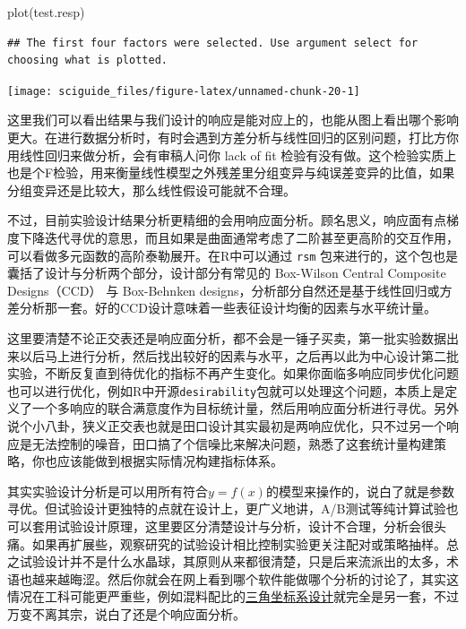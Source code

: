 \documentclass[]{tufte-book}
\newenvironment{Shaded}{}{}
\newcommand{\FunctionTok}[1]{\textcolor[rgb]{0.02,0.16,0.49}{#1}}
\newcommand{\NormalTok}[1]{#1}
\begin{document}
\begin{Shaded}
\begin{Highlighting}[]
\FunctionTok{plot}\NormalTok{(test.resp)}
\end{Highlighting}
\end{Shaded}

\begin{verbatim}
## The first four factors were selected. Use argument select for choosing what is plotted.
\end{verbatim}

\texttt{[image: sciguide\_files/figure-latex/unnamed-chunk-20-1]}

这里我们可以看出结果与我们设计的响应是能对应上的，也能从图上看出哪个影响更大。在进行数据分析时，有时会遇到方差分析与线性回归的区别问题，打比方你用线性回归来做分析，会有审稿人问你 lack of fit 检验有没有做。这个检验实质上也是个F检验，用来衡量线性模型之外残差里分组变异与纯误差变异的比值，如果分组变异还是比较大，那么线性假设可能就不合理。

不过，目前实验设计结果分析更精细的会用响应面分析。顾名思义，响应面有点梯度下降迭代寻优的意思，而且如果是曲面通常考虑了二阶甚至更高阶的交互作用，可以看做多元函数的高阶泰勒展开。在R中可以通过 \texttt{rsm} 包来进行的，这个包也是囊括了设计与分析两个部分，设计部分有常见的 Box-Wilson Central Composite Designs（CCD） 与 Box-Behnken designs，分析部分自然还是基于线性回归或方差分析那一套。好的CCD设计意味着一些表征设计均衡的因素与水平统计量。

这里要清楚不论正交表还是响应面分析，都不会是一锤子买卖，第一批实验数据出来以后马上进行分析，然后找出较好的因素与水平，之后再以此为中心设计第二批实验，不断反复直到待优化的指标不再产生变化。如果你面临多响应同步优化问题也可以进行优化，例如R中开源\texttt{desirability}包就可以处理这个问题，本质上是定义了一个多响应的联合满意度作为目标统计量，然后用响应面分析进行寻优。另外说个小八卦，狭义正交表也就是田口设计其实最初是两响应优化，只不过另一个响应是无法控制的噪音，田口搞了个信噪比来解决问题，熟悉了这套统计量构建策略，你也应该能做到根据实际情况构建指标体系。

其实实验设计分析是可以用所有符合\(y = f(x)\)的模型来操作的，说白了就是参数寻优。但试验设计更独特的点就在设计上，更广义地讲，A/B测试等纯计算试验也可以套用试验设计原理，这里要区分清楚设计与分析，设计不合理，分析会很头痛。如果再扩展些，观察研究的试验设计相比控制实验更关注配对或策略抽样。总之试验设计并不是什么水晶球，其原则从来都很清楚，只是后来流派出的太多，术语也越来越晦涩。然后你就会在网上看到哪个软件能做哪个分析的讨论了，其实这情况在工科可能更严重些，例如混料配比的\href{https://support.minitab.com/zh-cn/minitab/18/help-and-how-to/modeling-statistics/doe/supporting-topics/mixture-designs/what-is-a-mixture-design/}{三角坐标系设计}就完全是另一套，不过万变不离其宗，说白了还是个响应面分析。
\end{document}
